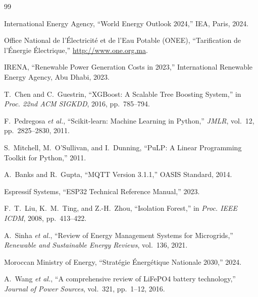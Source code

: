 \documentclass[12pt,a4paper,oneside]{report}
\begin{document}
\begin{thebibliography}{99}

 International Energy Agency, ``World Energy Outlook 2024,'' IEA, Paris, 2024.

 Office National de l'Électricité et de l'Eau Potable (ONEE), ``Tarification de l'Énergie Électrique,'' \url{http://www.one.org.ma}.

 IRENA, ``Renewable Power Generation Costs in 2023,'' International Renewable Energy Agency, Abu Dhabi, 2023.

 T.~Chen and C.~Guestrin, ``XGBoost: A Scalable Tree Boosting System,'' in \emph{Proc. 22nd ACM SIGKDD}, 2016, pp.~785--794.

 F.~Pedregosa \emph{et al.}, ``Scikit-learn: Machine Learning in Python,'' \emph{JMLR}, vol.~12, pp.~2825--2830, 2011.

 S.~Mitchell, M.~O'Sullivan, and I.~Dunning, ``PuLP: A Linear Programming Toolkit for Python,'' 2011.

 A.~Banks and R.~Gupta, ``MQTT Version 3.1.1,'' OASIS Standard, 2014.

 Espressif Systems, ``ESP32 Technical Reference Manual,'' 2023.

 F.~T.~Liu, K.~M.~Ting, and Z.-H.~Zhou, ``Isolation Forest,'' in \emph{Proc. IEEE ICDM}, 2008, pp.~413--422.

 A.~Sinha \emph{et al.}, ``Review of Energy Management Systems for Microgrids,'' \emph{Renewable and Sustainable Energy Reviews}, vol.~136, 2021.

 Moroccan Ministry of Energy, ``Stratégie Énergétique Nationale 2030,'' 2024.

 A.~Wang \emph{et al.}, ``A comprehensive review of LiFePO4 battery technology,'' \emph{Journal of Power Sources}, vol.~321, pp.~1--12, 2016.

\end{thebibliography}

\appendix

\end{document}

